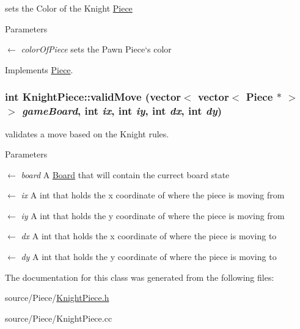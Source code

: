 sets the Color of the Knight \hyperlink{classPiece}{Piece} 
\begin{DoxyParams}{Parameters}
\item[\mbox{$\leftarrow$} {\em colorOfPiece}]sets the Pawn Piece`s color \end{DoxyParams}


Implements \hyperlink{classPiece_a1387cb503dca308ac1e3bbe38a70a073}{Piece}.\hypertarget{classKnightPiece_a9c8f78a9ef9a5e26c8011cb37a16e702}{
\subsubsection[{validMove}]{\setlength{\rightskip}{0pt plus 5cm}int KnightPiece::validMove (vector$<$ vector$<$ {\bf Piece} $\ast$ $>$ $>$ {\em gameBoard}, \/  int {\em ix}, \/  int {\em iy}, \/  int {\em dx}, \/  int {\em dy})}}
\label{classKnightPiece_a9c8f78a9ef9a5e26c8011cb37a16e702}


validates a move based on the Knight rules. 
\begin{DoxyParams}{Parameters}
\item[\mbox{$\leftarrow$} {\em board}]A \hyperlink{classBoard}{Board} that will contain the currect board state \item[\mbox{$\leftarrow$} {\em ix}]A int that holds the x coordinate of where the piece is moving from \item[\mbox{$\leftarrow$} {\em iy}]A int that holds the y coordinate of where the piece is moving from \item[\mbox{$\leftarrow$} {\em dx}]A int that holds the x coordinate of where the piece is moving to \item[\mbox{$\leftarrow$} {\em dy}]A int that holds the y coordinate of where the piece is moving to \end{DoxyParams}


The documentation for this class was generated from the following files:\begin{DoxyCompactItemize}
\item 
source/Piece/\hyperlink{KnightPiece_8h}{KnightPiece.h}\item 
source/Piece/KnightPiece.cc\end{DoxyCompactItemize}
